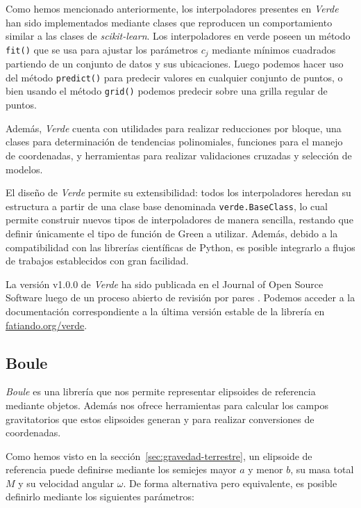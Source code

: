 Como hemos mencionado anteriormente, los interpoladores presentes en
\emph{Verde} han sido implementados mediante clases que reproducen un
comportamiento similar a las clases de \emph{scikit-learn}.
Los interpoladores en verde poseen un método \texttt{fit()} que se usa para
ajustar los parámetros $c_j$ mediante mínimos cuadrados partiendo de un
conjunto de datos y sus ubicaciones. Luego podemos hacer uso del método
\texttt{predict()} para predecir valores en cualquier conjunto de puntos,
o bien usando el método \texttt{grid()} podemos predecir sobre una grilla
regular de puntos.

Además, \emph{Verde} cuenta con utilidades para realizar reducciones por
bloque, una clases para determinación de tendencias polinomiales, funciones
para el manejo de coordenadas, y herramientas para realizar validaciones
cruzadas y selección de modelos.

El diseño de \emph{Verde} permite su extensibilidad: todos los interpoladores
heredan su estructura a partir de una clase base denominada
\texttt{verde.BaseClass}, lo cual permite construir nuevos tipos de
interpoladores de manera sencilla, restando que definir únicamente el tipo de
función de Green a utilizar.
Además, debido a la compatibilidad con las librerías científicas de Python, es
posible integrarlo a flujos de trabajos establecidos con gran facilidad.

La versión v1.0.0 de \emph{Verde} ha sido publicada en el Journal of Open
Source Software luego de un proceso abierto de revisión por pares
\citep{verde2018}.
Podemos acceder a la documentación correspondiente a la última versión estable
de la librería en \href{https://www.fatiando.org/verde}{fatiando.org/verde}.


\subsection{Boule}
\label{sec:boule}

\emph{Boule} es una librería que nos permite representar elipsoides de
referencia mediante objetos. Además nos ofrece herramientas para calcular los
campos gravitatorios que estos elipsoides generan y para realizar conversiones
de coordenadas.

Como hemos visto en la sección~\ref{sec:gravedad-terrestre}, un elipsoide de
referencia puede definirse mediante los semiejes mayor $a$ y menor $b$, su masa
total $M$ y su velocidad angular $\omega$.
De forma alternativa pero equivalente, es posible definirlo mediante los
siguientes parámetros:

